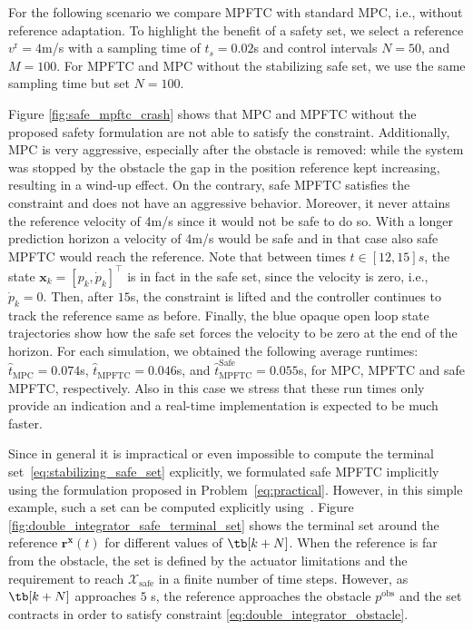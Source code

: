 \documentclass[journal]{IEEEtran}
\newcommand{\x}{{\mathbf{x}}}
\renewcommand{\r}{{\mathbf{r}}}
\newcommand{\review}[1]{#1}
\begin{document}
	
	For the following scenario we compare MPFTC with standard MPC, i.e., without reference adaptation.
	To highlight the benefit of a safety set, we select a reference $v^\mathrm{r}=4$m/s with a sampling time of $t_s=0.02$s and control intervals $N=50$, and $M=100$. For MPFTC and MPC without the stabilizing safe set, we use the same sampling time but set $N=100$. 
	
	Figure \ref{fig:safe_mpftc_crash} shows that MPC and MPFTC without the proposed safety formulation are not able to satisfy the constraint. Additionally, MPC is very aggressive, especially after the obstacle is removed: while the system was stopped by the obstacle the gap in the position reference kept increasing, resulting in a wind-up effect. On the contrary, safe MPFTC satisfies the constraint and does not have an aggressive behavior. Moreover, it never attains the reference velocity of 4m/s since it would not be safe to do so. With a longer prediction horizon a velocity of 4m/s would be safe and in that case also safe MPFTC would reach the reference. Note that between times $t\in[12,15]s$, the state $\x_k=[p_k,\dot{p}_k]^\top$ is in fact in the safe set, since the velocity is  zero, i.e., $\dot{p}_k=0$. Then, after $15$s, the constraint is lifted and the controller continues to track the reference same as before. Finally, the blue opaque open loop state trajectories show how the safe set forces the velocity to be zero at the end of the horizon. For each simulation, we obtained the following average runtimes: $\hat{t}_\mathrm{MPC}=0.074$s, $\hat{t}_\mathrm{MPFTC}=0.046$s, and $\hat{t}^\mathrm{Safe}_\mathrm{MPFTC}=0.055$s, for MPC, MPFTC and safe MPFTC, respectively. Also in this case we stress that these run times only provide an indication and a real-time implementation is expected to be much faster.
	
	Since in general it is impractical or even impossible to compute the terminal set~\eqref{eq:stabilizing_safe_set} explicitly, we formulated safe MPFTC implicitly using the formulation proposed in Problem~\eqref{eq:practical}. However, in this simple example, such a set can be computed explicitly \review{using~\cite{MPT3}}. Figure \ref{fig:double_integrator_safe_terminal_set} shows the terminal set around the reference $\r^\x(t)$ for different values  of $\tb[k+N]$. When the reference is far from the obstacle,  the set is defined by the actuator limitations and the requirement to reach $\mathcal{X}_\mathrm{safe}$ in a finite number of time steps. However, as $\tb[k+N]$ approaches $5$ s, the reference approaches the obstacle $p^\mathrm{obs}$ and the set contracts in order to satisfy constraint \eqref{eq:double_integrator_obstacle}.
	
\end{document}
